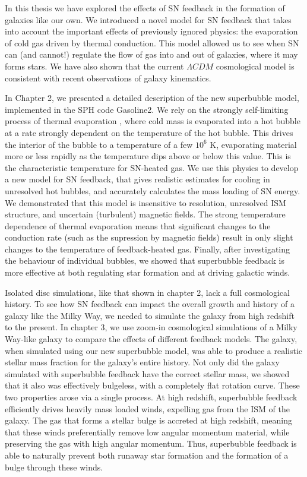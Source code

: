 In this thesis we have explored the effects of SN feedback in the formation of 
galaxies like our own.  We introduced a novel model for SN feedback that
takes into account the important effects of previously ignored physics: the
evaporation of cold gas driven by thermal conduction.  This model allowed us to
see when SN can (and cannot!) regulate the flow of gas into and out of galaxies,
where it may forms stars.  We have also shown that the current $\Lambda
CDM$ cosmological model is consistent with recent observations of galaxy
kinematics.

In Chapter 2, we presented a detailed description of the new superbubble model,
implemented in the SPH code {\sc Gasoline2}.  We rely on the strongly
self-limiting process of thermal evaporation \citep{Cowie1977}, where cold mass
is evaporated into a hot bubble at a rate strongly dependent on the temperature
of the hot bubble. This drives the interior of the bubble to a temperature of a
few $10^6$ K, evaporating material more or less rapidly as the temperature dips
above or below this value.  This is the characteristic temperature for SN-heated
gas.  We use this physics to develop a new model for SN feedback, that gives
realistic estimates for cooling in unresolved hot bubbles, and accurately
calculates the mass loading of SN energy.  We demonstrated that this model is
insensitive to resolution, unresolved ISM structure, and uncertain (turbulent)
magnetic fields.  The strong temperature dependence of thermal evaporation means
that significant changes to the conduction rate (such as the supression by
magnetic fields) result in only slight changes to the temperature of
feedback-heated gas.  Finally, after investigating the behaviour of individual
bubbles, we showed that superbubble feedback is more effective at both
regulating star formation and at driving galactic winds.

Isolated disc simulations, like that shown in chapter 2, lack a full
cosmological history.  To see how SN feedback can impact the overall growth and
history of a galaxy like the Milky Way, we needed to simulate the galaxy from
high redshift to the present.  In chapter 3, we use zoom-in cosmological
simulations \citet{Navarro1993} of a Milky Way-like galaxy to compare the
effects of different feedback models.  The galaxy, when simulated using our new
superbubble model, was able to produce a realistic stellar mass fraction for the
galaxy's entire history.  Not only did the galaxy simulated with superbubble
feedback have the correct stellar mass, we showed that it also was effectively
bulgeless, with a completely flat rotation curve.  These two properties arose
via a single process.  At high redshift, superbubble feedback efficiently drives
heavily mass loaded winds, expelling gas from the ISM of the galaxy.  The gas
that forms a stellar bulge is accreted at high redshift, meaning that these
winds preferentially remove low angular momentum material, while preserving the
gas with high angular momentum.  Thus, superbubble feedback is able to naturally
prevent both runaway star formation and the formation of a bulge through these
winds.

